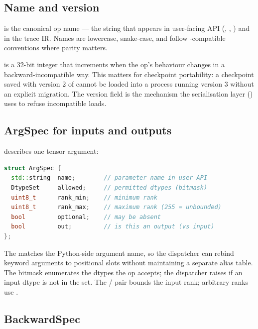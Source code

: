 \subsection{Name and version}
\label{ssec:op_registry:name_version}

 is the canonical op name --- the string that appears
in user-facing API (, , )
and in the trace IR. Names are lowercase, snake-case, and follow
-compatible conventions where parity matters.

 is a 32-bit integer that increments when the op's
behaviour changes in a backward-incompatible way. This matters for
checkpoint portability: a checkpoint saved with version 2 of
 cannot be loaded into a process running version
3 without an explicit migration. The version field is the
mechanism the serialisation layer () uses
to refuse incompatible loads.

\subsection{ArgSpec for inputs and outputs}
\label{ssec:op_registry:argspec}

 describes one tensor argument:

\begin{lstlisting}[style=lucidcpp,language=C++]
struct ArgSpec {
  std::string  name;        // parameter name in user API
  DtypeSet     allowed;     // permitted dtypes (bitmask)
  uint8_t      rank_min;    // minimum rank
  uint8_t      rank_max;    // maximum rank (255 = unbounded)
  bool         optional;    // may be absent
  bool         out;         // is this an output (vs input)
};
\end{lstlisting}

The  matches the Python-side argument name, so the
dispatcher can rebind keyword arguments to positional slots without
maintaining a separate alias table. The  bitmask
enumerates the dtypes the op accepts; the dispatcher raises
 if an input dtype is not in the set. The
 /  pair bounds the input rank;
arbitrary ranks use .

\subsection{BackwardSpec}
\label{ssec:op_registry:backward}

